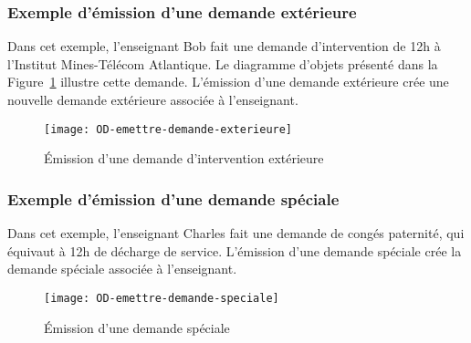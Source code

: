 \begin{ocl}
 \subsubsection{Exemple d'émission d'une demande extérieure}
Dans cet exemple, l'enseignant Bob fait une demande d'intervention de 12h à l'Institut Mines-Télécom Atlantique.
Le diagramme d'objets présenté dans la Figure~\ref{fig:demande:exterieure} illustre cette demande.
L'émission d'une demande extérieure crée une nouvelle demande extérieure associée à l'enseignant.
 
 \begin{figure}[!htbp]
 \begin{center}
 \texttt{[image: OD-emettre-demande-exterieure]}
 \caption{\'Emission d'une demande d'intervention extérieure}
 \label{fig:demande:exterieure}
 \end{center}
 \end{figure}

 \subsubsection{Exemple d'émission d'une demande spéciale}
Dans cet exemple, l'enseignant Charles fait une demande de congés paternité, qui équivaut à 12h de décharge de service.
L'émission d'une demande spéciale crée la demande spéciale associée à l'enseignant.
\begin{figure}[!htbp]
\begin{center}
\texttt{[image: OD-emettre-demande-speciale]}
\caption{\'Emission d'une demande spéciale}
\end{center}
\end{figure}





\end{ocl}
